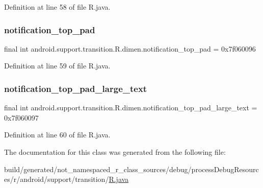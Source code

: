 Definition at line 58 of file R.\+java.

\mbox{\label{classandroid_1_1support_1_1transition_1_1_r_1_1dimen_a3ec428b9cec392b60627b804f667d059}} 
\subsubsection{\texorpdfstring{notification\_top\_pad}{notification\_top\_pad}}
{\footnotesize\ttfamily final int android.\+support.\+transition.\+R.\+dimen.\+notification\+\_\+top\+\_\+pad = 0x7f060096\hspace{0.3cm}{\ttfamily [static]}}



Definition at line 59 of file R.\+java.

\mbox{\label{classandroid_1_1support_1_1transition_1_1_r_1_1dimen_a473785d8fc51af681f93deb9a8fbc8b0}} 
\subsubsection{\texorpdfstring{notification\_top\_pad\_large\_text}{notification\_top\_pad\_large\_text}}
{\footnotesize\ttfamily final int android.\+support.\+transition.\+R.\+dimen.\+notification\+\_\+top\+\_\+pad\+\_\+large\+\_\+text = 0x7f060097\hspace{0.3cm}{\ttfamily [static]}}



Definition at line 60 of file R.\+java.



The documentation for this class was generated from the following file\+:\begin{DoxyCompactItemize}
\item 
build/generated/not\+\_\+namespaced\+\_\+r\+\_\+class\+\_\+sources/debug/process\+Debug\+Resources/r/android/support/transition/\mbox{\hyperlink{android_2support_2transition_2_r_8java}{R.\+java}}\end{DoxyCompactItemize}

